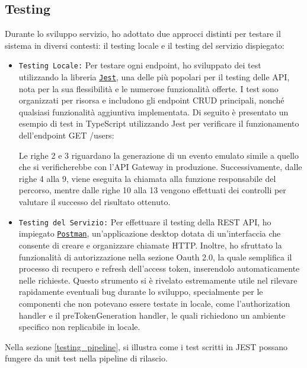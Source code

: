
\subsection{Testing}
\label{testing_api}
Durante lo sviluppo servizio, ho adottato due approcci distinti per testare il sistema in diversi contesti: il testing locale e il testing del servizio dispiegato:

\begin{itemize}
    \item \texttt{Testing Locale:} Per testare ogni endpoint, ho sviluppato dei test utilizzando la libreria \href{https://jestjs.io/docs/getting-started}{\texttt{Jest}}, una delle più popolari per il testing delle API, nota per la sua flessibilità e le numerose funzionalità offerte. I test sono organizzati per risorsa e includono gli endpoint CRUD principali, nonché qualsiasi funzionalità aggiuntiva implementata.
    Di seguito è presentato un esempio di test in TypeScript utilizzando Jest per verificare il funzionamento dell'endpoint GET /users:

    

    Le righe 2 e 3 riguardano la generazione di un evento emulato simile a quello che si verificherebbe con l'API Gateway in produzione. Successivamente, dalle righe 4 alla 9, viene eseguita la chiamata alla funzione responsabile del percorso, mentre dalle righe 10 alla 13 vengono effettuati dei controlli per valutare il successo del risultato ottenuto.

    \item \texttt{Testing del Servizio:} Per effettuare il testing della REST API, ho impiegato \href{https://www.postman.com/}{\texttt{Postman}}, un'applicazione desktop dotata di un'interfaccia che consente di creare e organizzare chiamate HTTP. Inoltre, ho sfruttato la funzionalità di autorizzazione nella sezione Oauth 2.0, la quale semplifica il processo di recupero e refresh dell'access token, inserendolo automaticamente nelle richieste. Questo strumento si è rivelato estremamente utile nel rilevare rapidamente eventuali bug durante lo sviluppo, specialmente per le componenti che non potevano essere testate in locale, come l'authorization handler e il preTokenGeneration handler, le quali richiedono un ambiente specifico non replicabile in locale.
\end{itemize}


Nella sezione \ref{testing_pipeline}, si illustra come i test scritti in JEST possano fungere da unit test nella pipeline di rilascio.



